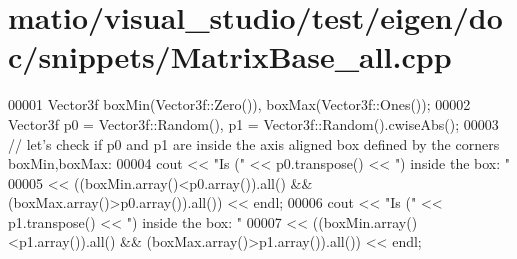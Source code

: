 \hypertarget{matio_2visual__studio_2test_2eigen_2doc_2snippets_2_matrix_base__all_8cpp_source}{}\section{matio/visual\+\_\+studio/test/eigen/doc/snippets/\+Matrix\+Base\+\_\+all.cpp}
\label{matio_2visual__studio_2test_2eigen_2doc_2snippets_2_matrix_base__all_8cpp_source}

\begin{DoxyCode}
00001 Vector3f boxMin(Vector3f::Zero()), boxMax(Vector3f::Ones());
00002 Vector3f p0 = Vector3f::Random(), p1 = Vector3f::Random().cwiseAbs();
00003 \textcolor{comment}{// let's check if p0 and p1 are inside the axis aligned box defined by the corners boxMin,boxMax:}
00004 cout << \textcolor{stringliteral}{"Is ("} << p0.transpose() << \textcolor{stringliteral}{") inside the box: "}
00005      << ((boxMin.array()<p0.array()).all() && (boxMax.array()>p0.array()).all()) << endl;
00006 cout << \textcolor{stringliteral}{"Is ("} << p1.transpose() << \textcolor{stringliteral}{") inside the box: "}
00007      << ((boxMin.array()<p1.array()).all() && (boxMax.array()>p1.array()).all()) << endl;
\end{DoxyCode}
